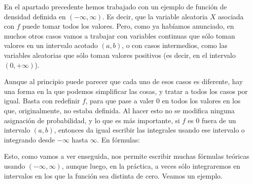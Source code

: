 En el apartado precedente hemos trabajado con un ejemplo de función de densidad definida en $(-\infty, \infty)$. Es decir, que la variable aleatoria $X$ asociada con $f$ puede tomar todos los valores. Pero, como ya habíamos anunciado, en muchos otros casos vamos a trabajar con variables continuas que sólo toman valores en un intervalo acotado $(a,b)$, o con casos intermedios, como las variables aleatorias que sólo toman valores positivos (es decir, en el intervalo $(0,+\infty)$).

Aunque al principio puede parecer que cada uno de esos casos es diferente, hay una forma en la que podemos simplificar las cosas, y tratar a todos los casos por igual. {\sf Basta con redefinir $f$, para que pase a valer $0$ en todos los valores en los que, originalmente, no estaba definida.} Al hacer esto no se modifica ninguna asignación de probabilidad, y lo que es más importante, si $f$ es $0$ fuera de un intervalo $(a,b)$, entonces da igual escribir las integrales usando ese intervalo o integrando desde $-\infty$ hasta $\infty$. En fórmulas:
    \begin{center}
    \end{center}
Esto, como vamos a ver enseguida, nos permite escribir muchas fórmulas teóricas usando $(-\infty,\infty)$, aunque luego, en la práctica, a veces sólo integraremos en intervalos en los que la función sea distinta de cero. Veamos un ejemplo.
